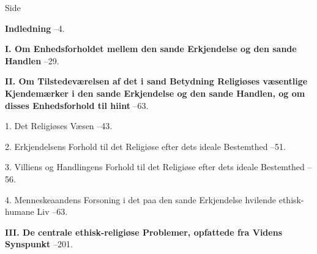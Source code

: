 \begingroup
{}
\begin{list}{}{%
  \setlength{\leftmargin}{2.2em}\setlength{\itemindent}{-2.2em}%
  \setlength{\itemsep}{2pt}\setlength{\parsep}{0pt}}

\item[] \hfill Side

\item \textbf{Indledning} --4.

\item \textbf{I. Om Enhedsforholdet mellem den sande Erkjendelse og den
  sande Handlen} --29.

\item \textbf{II. Om Tilstedeværelsen af det i sand Betydning Religiøses
  væsentlige Kjendemærker i den sande Erkjendelse og den sande Handlen,
  og om disses Enhedsforhold til hiint} --63.

\item[] \hspace{1.2em} 1. Det Religiøses Væsen --43.
\item[] \hspace{1.2em} 2. Erkjendelsens Forhold til det Religiøse efter
  dets ideale Bestemthed --51.
\item[] \hspace{1.2em} 3. Villiens og Handlingens Forhold til det
  Religiøse efter dets ideale Bestemthed --56.
\item[] \hspace{1.2em} 4. Menneskeaandens Forsoning i det paa den sande
  Erkjendelse hvilende ethisk-humane Liv --63.

\item \textbf{III. De centrale ethisk-religiøse Problemer, opfattede fra
  Videns Synspunkt} --201.


\end{list}
